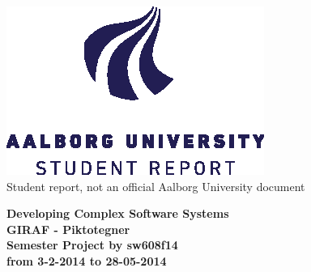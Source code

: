 \thispagestyle{empty} %
\begin{center}
	\includegraphics[scale=1]{media/aau-logo-vector}\\
	\vspace{0.25cm}
	Student report, not an official Aalborg University document
\end{center} 

\vspace{1cm}
\begin{center}
\textbf{\huge {Developing Complex Software Systems}} \\ \vspace{0.5cm}
\textbf{\Large {GIRAF - Piktotegner}} \\ \vspace{1cm}
\textbf{\large Semester Project by sw608f14}\\ \vspace{0.5cm}
\textbf{\normalsize from 3-2-2014 to 28-05-2014}\\
\end{center}

\vspace{0.25cm}


\thispagestyle{empty}

\newpage
\thispagestyle{empty}
\mbox{}


